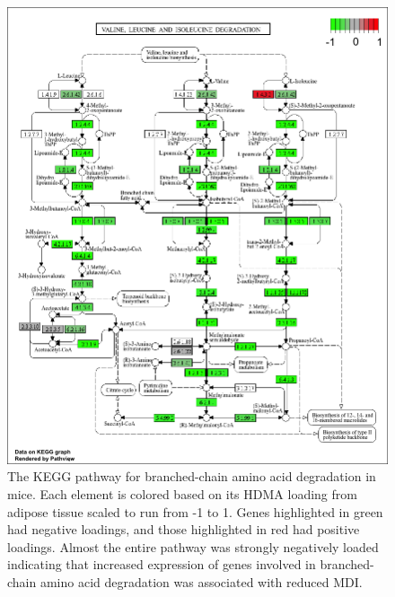 \documentclass[
]{article}
\begin{document}
\begin{figure}[ht!]
\includegraphics[width=\textwidth]{Figures/Supp_Fig_Branched_Chain.png} 
\caption{The KEGG pathway for branched-chain amino acid degradation in 
mice. Each element is colored based on its HDMA loading from adipose
tissue scaled to run from -1 to 1. Genes highlighted in green had 
negative loadings, and those highlighted in red had positive loadings. 
Almost the entire pathway was strongly negatively loaded indicating 
that increased expression of genes involved in branched-chain amino acid 
degradation was associated with reduced MDI.
}
\label{fig:bcaa_degrataion}
\end{figure}
\end{document}
